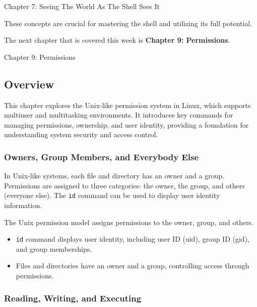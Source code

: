 \begin{notes}{Chapter 7: Seeing The World As The Shell Sees It}
\begin{highlight}
    These concepts are crucial for mastering the shell and utilizing its full potential.
    
    \end{highlight}
\end{notes}

The next chapter that is covered this week is \textbf{Chapter 9: Permissions}.

\begin{notes}{Chapter 9: Permissions}
    \subsection*{Overview}

    This chapter explores the Unix-like permission system in Linux, which supports multiuser and multitasking environments. It introduces key commands for managing permissions, ownership, and user 
    identity, providing a foundation for understanding system security and access control.
    
    \subsubsection*{Owners, Group Members, and Everybody Else}
    
    In Unix-like systems, each file and directory has an owner and a group. Permissions are assigned to three categories: the owner, the group, and others (everyone else). The \texttt{id} command 
    can be used to display user identity information.
    
    \begin{highlight}
    
    The Unix permission model assigns permissions to the owner, group, and others.
    
    \begin{itemize}
        \item \texttt{id} command displays user identity, including user ID (uid), group ID (gid), and group memberships.
        \item Files and directories have an owner and a group, controlling access through permissions.
    \end{itemize}
    
    \end{highlight}
    
    \subsubsection*{Reading, Writing, and Executing}
    

\end{notes}
